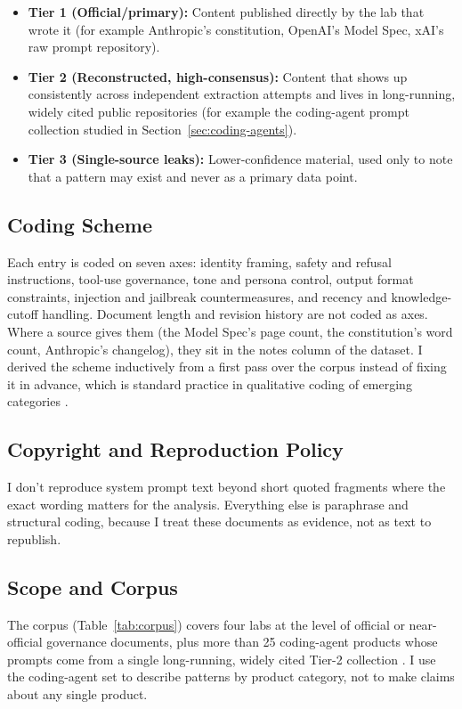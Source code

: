 \documentclass[11pt]{article}
\begin{document}
\begin{itemize}[leftmargin=*]
  \item \textbf{Tier 1 (Official/primary):} Content published directly by the
    lab that wrote it (for example Anthropic's constitution, OpenAI's Model
    Spec, xAI's raw prompt repository).
  \item \textbf{Tier 2 (Reconstructed, high-consensus):} Content that shows up
    consistently across independent extraction attempts and lives in
    long-running, widely cited public repositories (for example the
    coding-agent prompt collection studied in
    Section~\ref{sec:coding-agents}).
  \item \textbf{Tier 3 (Single-source leaks):} Lower-confidence material, used
    only to note that a pattern may exist and never as a primary data point.
\end{itemize}

\subsection{Coding Scheme}
Each entry is coded on seven axes: identity framing, safety and refusal
instructions, tool-use governance, tone and persona control, output format
constraints, injection and jailbreak countermeasures, and recency and
knowledge-cutoff handling. Document length and revision history are not coded
as axes. Where a source gives them (the Model Spec's page count, the
constitution's word count, Anthropic's changelog), they sit in the notes
column of the dataset. I derived the scheme inductively from a first pass over
the corpus instead of fixing it in advance, which is standard practice in
qualitative coding of emerging categories \citep{promptdefects2025}.

\subsection{Copyright and Reproduction Policy}
I don't reproduce system prompt text beyond short quoted fragments where the
exact wording matters for the analysis. Everything else is paraphrase and
structural coding, because I treat these documents as evidence, not as text to
republish.

\subsection{Scope and Corpus}
The corpus (Table~\ref{tab:corpus}) covers four labs at the level of official
or near-official governance documents, plus more than 25 coding-agent products
whose prompts come from a single long-running, widely cited Tier-2 collection
\citep{x1xhlol2026repo}. I use the coding-agent set to describe patterns by
product category, not to make claims about any single product.
\end{document}
